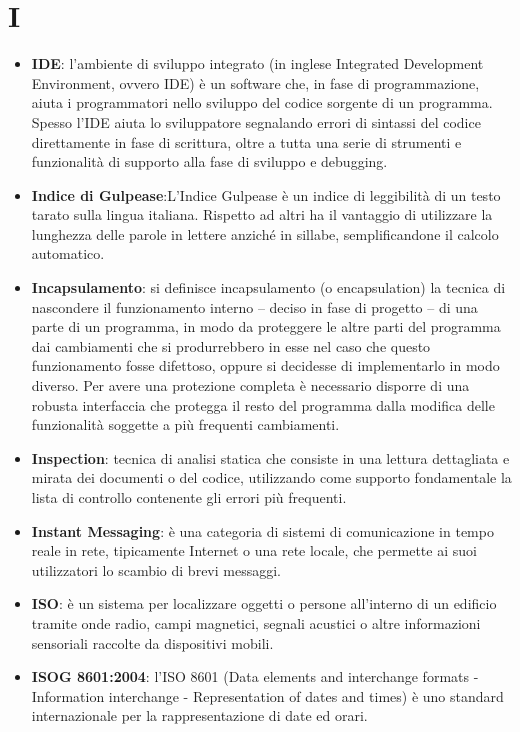 \section{I}
\begin{itemize} 
	\item
	\textbf{IDE}: l’ambiente di sviluppo integrato (in inglese Integrated Development Environment, ovvero IDE) è un software che, in fase di programmazione, aiuta i programmatori nello sviluppo del codice sorgente di un programma. Spesso l’IDE aiuta lo sviluppatore segnalando errori di sintassi del codice direttamente in fase di scrittura, oltre a tutta una serie di strumenti e funzionalità di supporto alla fase di sviluppo e debugging.
	\item
	\textbf{Indice di Gulpease}:L'Indice Gulpease è un indice di leggibilità di un testo tarato sulla lingua italiana. Rispetto ad altri ha il vantaggio di utilizzare la lunghezza delle parole in lettere anziché in sillabe, semplificandone il calcolo automatico.
	\item
	\textbf{Incapsulamento}: si definisce incapsulamento (o encapsulation) la tecnica di nascondere il funzionamento interno – deciso in fase di progetto – di una parte di un programma, in modo da proteggere le altre parti del programma dai cambiamenti che si produrrebbero in esse nel caso che questo funzionamento fosse difettoso, oppure si decidesse di implementarlo in modo diverso. Per avere una protezione completa è necessario disporre di una robusta interfaccia che protegga il resto del programma dalla modifica delle funzionalità soggette a più frequenti cambiamenti.
	\item
	\textbf{Inspection}: tecnica di analisi statica che consiste in una lettura dettagliata e mirata dei documenti o del codice, utilizzando come supporto fondamentale la lista di controllo contenente gli errori più frequenti.
	\item
	\textbf{Instant Messaging}: è una categoria di sistemi di comunicazione in tempo reale in rete, tipicamente Internet o una rete locale, che permette ai suoi utilizzatori lo scambio di brevi messaggi.
	\item
	\textbf{ISO}: è un sistema per localizzare oggetti o persone all'interno di un edificio tramite onde radio, campi magnetici, segnali acustici o altre informazioni sensoriali raccolte da dispositivi mobili.
	\item
	\textbf{ISOG 8601:2004}: l'ISO 8601 (Data elements and interchange formats - Information interchange - Representation of dates and times) è uno standard internazionale per la rappresentazione di date ed orari.

\end{itemize}
